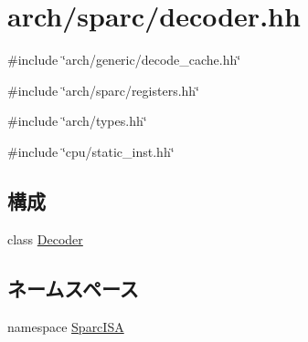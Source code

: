 \hypertarget{sparc_2decoder_8hh}{
\section{arch/sparc/decoder.hh}
\label{sparc_2decoder_8hh}
}
{\ttfamily \#include \char`\"{}arch/generic/decode\_\-cache.hh\char`\"{}}\par
{\ttfamily \#include \char`\"{}arch/sparc/registers.hh\char`\"{}}\par
{\ttfamily \#include \char`\"{}arch/types.hh\char`\"{}}\par
{\ttfamily \#include \char`\"{}cpu/static\_\-inst.hh\char`\"{}}\par
\subsection*{構成}
\begin{DoxyCompactItemize}
\item 
class \hyperlink{classSparcISA_1_1Decoder}{Decoder}
\end{DoxyCompactItemize}
\subsection*{ネームスペース}
\begin{DoxyCompactItemize}
\item 
namespace \hyperlink{namespaceSparcISA}{SparcISA}
\end{DoxyCompactItemize}
